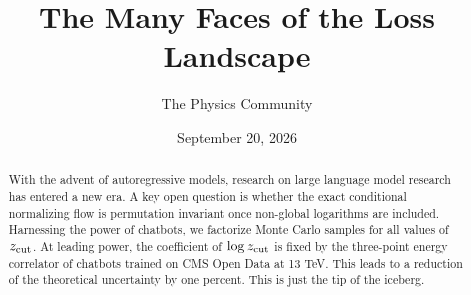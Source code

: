 \documentclass[11pt]{article}
\title{The Many Faces of the Loss Landscape}
\author{The Physics Community}
\date{September 20, 2026}
\numberwithin{equation}{section}
\theoremstyle{definition}
\theoremstyle{remark}
\begin{document}
\maketitle
\begin{abstract}
With the advent of autoregressive models, research on large language
model research has entered a new era. A key open question is whether the
exact conditional normalizing flow is permutation invariant once
non-global logarithms are included. Harnessing the power of chatbots, we
factorize Monte Carlo samples for all values of $z_{\rm cut}$. At
leading power, the coefficient of $\log z_{\rm cut}$ is fixed by the
three-point energy correlator of chatbots trained on CMS Open Data at 13
TeV. This leads to a reduction of the theoretical uncertainty by one
percent. This is just the tip of the iceberg.
\end{abstract}
\tableofcontents





\nocite{*}


\end{document}
